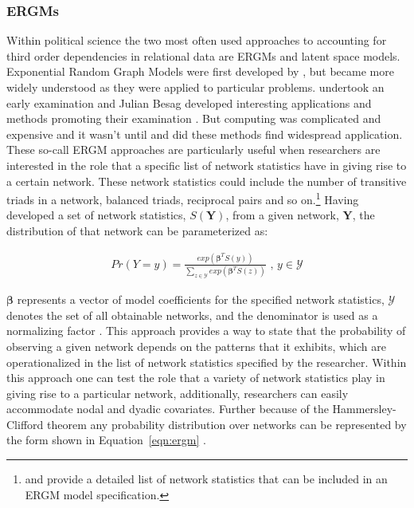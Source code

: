 \subsubsection{\textbf{ERGMs}}

Within political science the two most often used approaches to accounting for third order dependencies in relational data are ERGMs and latent space models. Exponential Random Graph Models were first developed by \citet{erdos:renyi:1959,erdos:renyi}, but became more widely understood as they were applied to particular problems.  \citet{frank:1971} undertook an early examination and Julian Besag developed interesting applications and methods promoting their examination \citep{1977b}. But computing was complicated and expensive and it wasn't until \citet{frank:strauss:1986} and \citet{wasserman:pattison:1996} did
these methods find widespread application.  These so-call ERGM approaches are particularly useful when researchers are interested in the role that a specific list of network statistics have in giving rise to a certain network. These network statistics could include the number of transitive triads in a network, balanced triads, reciprocal pairs and so on.\footnote{\citet{morris:etal:2008} and \citet{snijders:etal:2006} provide a detailed list of network statistics that can be included in an ERGM model specification.} Having developed a set of network statistics, $S(\mathbf{Y})$, from a given network, $\mathbf{Y}$, the distribution of that network can be parameterized as:

\begin{align}
Pr(Y = y) = \frac{ exp( \bm\beta^{T} S(y)  )  }{ \sum_{z \in \mathcal{Y}} exp( \bm\beta^{T} S(z)  )  } \text{ ,  } y \in \mathcal{Y}
\label{eqn:ergm}
\end{align}

$\bm\beta$ represents a vector of model coefficients for the specified network statistics, $\mathcal{Y}$ denotes the set of all obtainable networks, and the denominator is used as a normalizing factor \citep{hunter:etal:2008}. This approach provides a way to state that the probability of observing a given network depends on the patterns that it exhibits, which are operationalized in the list of network statistics specified by the researcher. Within this approach one can test the role that a variety of network statistics play in giving rise to a particular network, additionally, researchers can easily accommodate nodal and dyadic covariates. Further because of the Hammersley-Clifford theorem any probability distribution over networks can be represented by the form shown in Equation~\ref{eqn:ergm} \cite{hammersley:clifford:1971}. 

